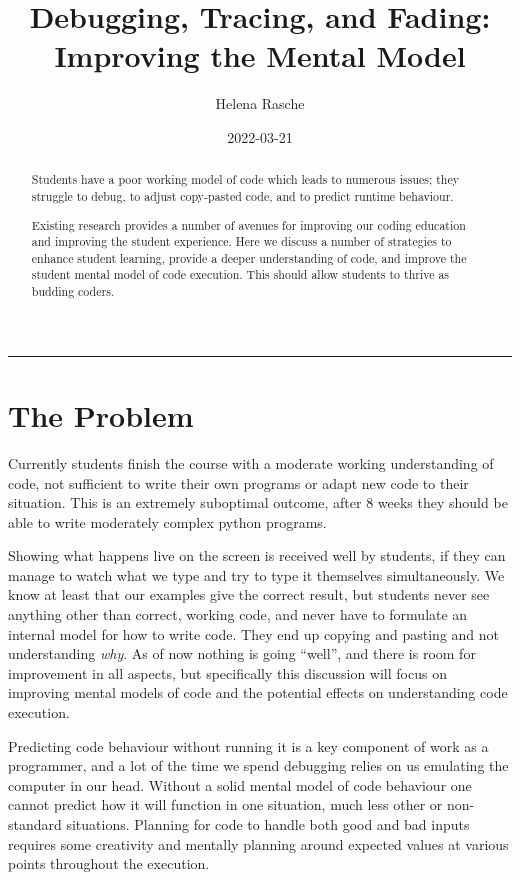 \documentclass[paper=a4,]{tufte-handout}
\title[]{Debugging, Tracing, and Fading: Improving the Mental Model}
\author{Helena Rasche}
\date{2022-03-21}
\begin{document}
\maketitle
\begin{abstract}
Students have a poor working model of code which leads to numerous
issues; they struggle to debug, to adjust copy-pasted code, and to
predict runtime behaviour.

Existing research provides a number of avenues for improving our coding
education and improving the student experience. Here we discuss a number
of strategies to enhance student learning, provide a deeper
understanding of code, and improve the student mental model of code
execution. This should allow students to thrive as budding coders.
\end{abstract}
\noindent\rule{5in}{0.4pt}


\hypertarget{the-problem}{%
\section{The Problem}\label{the-problem}}

Currently students finish the course with a moderate working
understanding of code, not sufficient to write their own programs or
adapt new code to their situation. This is an extremely suboptimal
outcome, after 8 weeks they should be able to write moderately complex
python programs.

Showing what happens live on the screen is received well by students, if
they can manage to watch what we type and try to type it themselves
simultaneously. We know at least that our examples give the correct
result, but students never see anything other than correct, working
code, and never have to formulate an internal model for how to write
code. They end up copying and pasting and not understanding \emph{why}.
As of now nothing is going ``well'', and there is room for improvement
in all aspects, but specifically this discussion will focus on improving
mental models of code and the potential effects on understanding code
execution.

Predicting code behaviour without running it is a key component of work
as a programmer, and a lot of the time we spend debugging relies on us
emulating the computer in our head. Without a solid mental model of code
behaviour one cannot predict how it will function in one situation, much
less other or non-standard situations. Planning for code to handle both
good and bad inputs requires some creativity and mentally planning
around expected values at various points throughout the execution.
\end{document}

